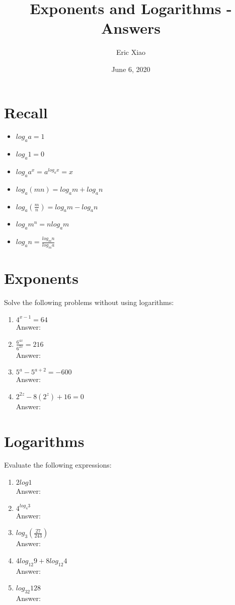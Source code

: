 \documentclass[12pt]{extarticle}
\title{Exponents and Logarithms - Answers}
\author{Eric Xiao}
\date{June 6, 2020}
\begin{document}
\maketitle

\section{Recall}
\begin{itemize}
    \item {$log_a a = 1$}
    \item {$log_a 1 = 0$}
    \item {$log_a a^x = a^{log_a x} = x$}
    \item {$log_a (mn) = log_a m + log_a n$}
    \item {$log_a (\frac{m}{n}) = log_a m - log_a n$}
    \item {$log_a m^n = nlog_a m$}
    \item {$log_a n = \frac{log_m n}{log_m a}$}
\end{itemize}

\section{Exponents}
{Solve the following problems without using logarithms:}
\begin{enumerate}
    \itemsep 1.5em
    \item {$4^{x-1} = 64$ \\Answer: }
    \item {$\frac{6^{4x}}{6^{2x}} = 216$ \\Answer: }
    \item {$5^a - 5^{a+2} = -600$ \\Answer: }
    \item {$2^{2z} - 8(2^z) + 16 = 0$ \\Answer: }
\end{enumerate}

\section{Logarithms}
{Evaluate the following expressions:}
\begin{enumerate}
    \itemsep 1.5em
    \item {$2log1$ \\Answer: }
    \item {$4^{log_4 3}$ \\Answer: }
    \item {$log_3 (\frac{27}{243})$ \\Answer: }
    \item {$4log_{12} 9 + 8log_{12} 4$ \\Answer: }
    \item {$log_{32} 128$ \\Answer: }
\end{enumerate}
\end{document}
